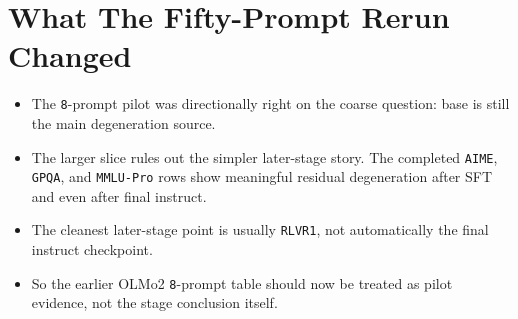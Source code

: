 \documentclass[11pt]{article}
\begin{document}
\section*{What The Fifty-Prompt Rerun Changed}
\begin{itemize}[leftmargin=1.5em]
\item The \texttt{8}-prompt pilot was directionally right on the coarse question: base is still the main degeneration source.
\item The larger slice rules out the simpler later-stage story. The completed \texttt{AIME}, \texttt{GPQA}, and \texttt{MMLU-Pro} rows show meaningful residual degeneration after SFT and even after final instruct.
\item The cleanest later-stage point is usually \texttt{RLVR1}, not automatically the final instruct checkpoint.
\item So the earlier OLMo2 \texttt{8}-prompt table should now be treated as pilot evidence, not the stage conclusion itself.
\end{itemize}
\end{document}
